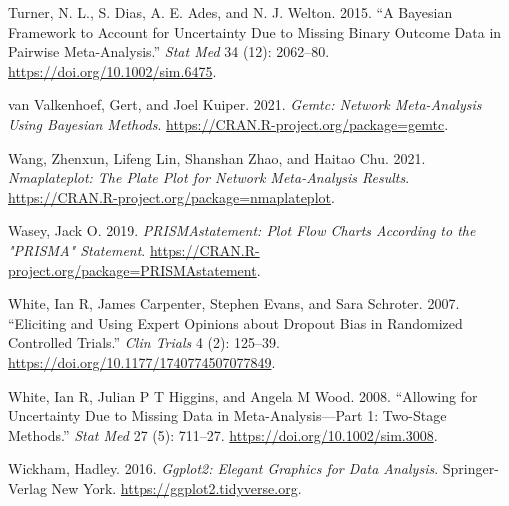 \begin{CSLReferences}{1}{0}
\leavevmode{}%
Turner, N. L., S. Dias, A. E. Ades, and N. J. Welton. 2015. {``A Bayesian Framework to Account for Uncertainty Due to Missing Binary Outcome Data in Pairwise Meta-Analysis.''} \emph{Stat Med} 34 (12): 2062--80. \url{https://doi.org/10.1002/sim.6475}.

\leavevmode{}%
van Valkenhoef, Gert, and Joel Kuiper. 2021. \emph{Gemtc: Network Meta-Analysis Using Bayesian Methods}. \url{https://CRAN.R-project.org/package=gemtc}.

\leavevmode{}%
Wang, Zhenxun, Lifeng Lin, Shanshan Zhao, and Haitao Chu. 2021. \emph{Nmaplateplot: The Plate Plot for Network Meta-Analysis Results}. \url{https://CRAN.R-project.org/package=nmaplateplot}.

\leavevmode{}%
Wasey, Jack O. 2019. \emph{PRISMAstatement: Plot Flow Charts According to the "PRISMA" Statement}. \url{https://CRAN.R-project.org/package=PRISMAstatement}.

\leavevmode{}%
White, Ian R, James Carpenter, Stephen Evans, and Sara Schroter. 2007. {``Eliciting and Using Expert Opinions about Dropout Bias in Randomized Controlled Trials.''} \emph{Clin Trials} 4 (2): 125--39. \url{https://doi.org/10.1177/1740774507077849}.

\leavevmode{}%
White, Ian R, Julian P T Higgins, and Angela M Wood. 2008. {``Allowing for Uncertainty Due to Missing Data in Meta-Analysis---Part 1: Two-Stage Methods.''} \emph{Stat Med} 27 (5): 711--27. \url{https://doi.org/10.1002/sim.3008}.

\leavevmode{}%
Wickham, Hadley. 2016. \emph{Ggplot2: Elegant Graphics for Data Analysis}. Springer-Verlag New York. \url{https://ggplot2.tidyverse.org}.

\end{CSLReferences}



\address{%
Loukia M. Spineli\\
Midwifery Research and Education Unit\\%
Hannover Medical School\\ Carl-Neuber-Strasse 1, 30625, Hannover, Germany\\
%
\url{https://www.github.com/LoukiaSpin}\\%
\textit{ORCiD: \href{https://orcid.org/0000-0001-9515-582X}{0000-0001-9515-582X}}\\%
\href{mailto:Spineli.Loukia@mh-hannover.de}{\nolinkurl{Spineli.Loukia@mh-hannover.de}}%
}

